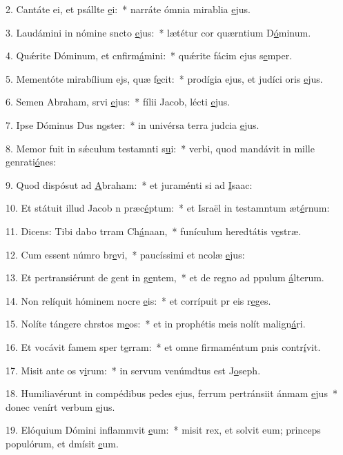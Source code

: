 2. Cantáte ei, et psállte \uline{e}i:~* narráte ómnia mirablia \uline{e}jus.\par 
3. Laudámini in nómine sncto \uline{e}jus:~* lætétur cor quærntium D\uline{ó}minum.\par 
4. Quǽrite Dóminum, et cnfirm\uline{á}mini:~* quǽrite fácim ejus s\uline{e}mper.\par 
5. Mementóte mirabílium ejs, quæ f\uline{e}cit:~* prodígia ejus, et judíci oris \uline{e}jus.\par 
6. Semen Abraham, srvi \uline{e}jus:~* fílii Jacob, lécti \uline{e}jus.\par 
7. Ipse Dóminus Dus n\uline{o}ster:~* in univérsa terra judcia \uline{e}jus.\par 
8. Memor fuit in sǽculum testamnti s\uline{u}i:~* verbi, quod mandávit in mille genrati\uline{ó}nes:\par 
9. Quod dispósut ad \uline{A}braham:~* et juraménti si ad \uline{I}saac:\par 
10. Et státuit illud Jacob n præc\uline{é}ptum:~* et Israël in testamntum æt\uline{é}rnum:\par 
11. Dicens: Tibi dabo trram Ch\uline{á}naan,~* funículum heredtátis v\uline{e}stræ.\par 
12. Cum essent númro br\uline{e}vi,~* paucíssimi et ncolæ \uline{e}jus:\par 
13. Et pertransiérunt de gent in g\uline{e}ntem,~* et de regno ad ppulum \uline{á}lterum.\par 
14. Non relíquit hóminem nocre \uline{e}is:~* et corrípuit pr eis r\uline{e}ges.\par 
15. Nolíte tángere chrstos m\uline{e}os:~* et in prophétis meis nolít malign\uline{á}ri.\par 
16. Et vocávit famem sper t\uline{e}rram:~* et omne firmaméntum pnis contr\uline{í}vit.\par 
17. Misit ante os v\uline{i}rum:~* in servum venúmdtus est J\uline{o}seph.\par 
18. Humiliavérunt in compédibus pedes ejus, ferrum pertránsiit ánmam \uline{e}jus~* donec venírt verbum \uline{e}jus.\par 
19. Elóquium Dómini inflammvit \uline{e}um:~* misit rex, et solvit eum; princeps populórum, et dmísit \uline{e}um.\par 
